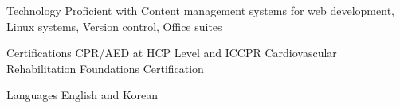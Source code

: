 

\begin{cvskills}

  \cvskill
    {Technology} %
    {Proficient with Content management systems for web development, Linux systems, Version control, Office suites} %

  \cvskill
    {Certifications} %
    {CPR/AED at HCP Level and ICCPR Cardiovascular Rehabilitation Foundations Certification} %

  \cvskill
    {Languages} %
    {English and Korean} %


\end{cvskills}
